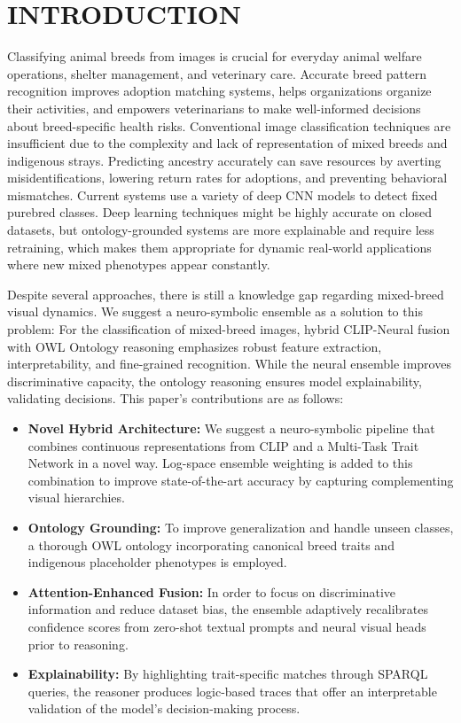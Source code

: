 \documentclass[conference]{IEEEtran}
\begin{document}
\section{INTRODUCTION}
Classifying animal breeds from images is crucial for everyday animal welfare operations, shelter management, and veterinary care. Accurate breed pattern recognition improves adoption matching systems, helps organizations organize their activities, and empowers veterinarians to make well-informed decisions about breed-specific health risks. Conventional image classification techniques are insufficient due to the complexity and lack of representation of mixed breeds and indigenous strays. Predicting ancestry accurately can save resources by averting misidentifications, lowering return rates for adoptions, and preventing behavioral mismatches. Current systems use a variety of deep CNN models to detect fixed purebred classes. Deep learning techniques might be highly accurate on closed datasets, but ontology-grounded systems are more explainable and require less retraining, which makes them appropriate for dynamic real-world applications where new mixed phenotypes appear constantly. 

Despite several approaches, there is still a knowledge gap regarding mixed-breed visual dynamics. We suggest a neuro-symbolic ensemble as a solution to this problem: For the classification of mixed-breed images, hybrid CLIP-Neural fusion with OWL Ontology reasoning emphasizes robust feature extraction, interpretability, and fine-grained recognition. While the neural ensemble improves discriminative capacity, the ontology reasoning ensures model explainability, validating decisions. This paper's contributions are as follows:
\begin{itemize}
    \item \textbf{Novel Hybrid Architecture:} We suggest a neuro-symbolic pipeline that combines continuous representations from CLIP and a Multi-Task Trait Network in a novel way. Log-space ensemble weighting is added to this combination to improve state-of-the-art accuracy by capturing complementing visual hierarchies.
    \item \textbf{Ontology Grounding:} To improve generalization and handle unseen classes, a thorough OWL ontology incorporating canonical breed traits and indigenous placeholder phenotypes is employed.
    \item \textbf{Attention-Enhanced Fusion:} In order to focus on discriminative information and reduce dataset bias, the ensemble adaptively recalibrates confidence scores from zero-shot textual prompts and neural visual heads prior to reasoning.
    \item \textbf{Explainability:} By highlighting trait-specific matches through SPARQL queries, the reasoner produces logic-based traces that offer an interpretable validation of the model's decision-making process.
\end{itemize}
\end{document}

